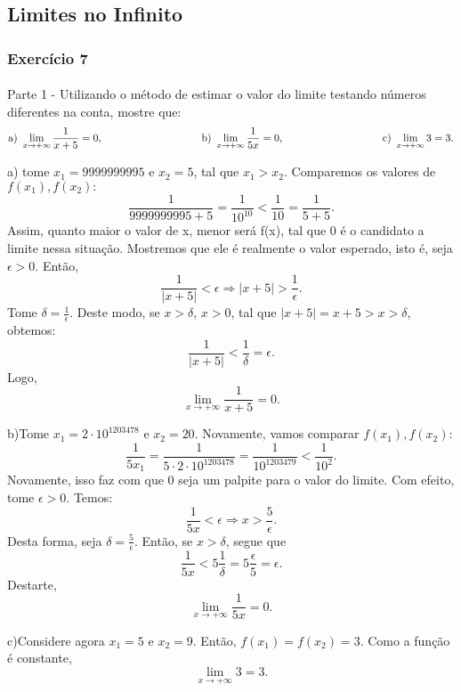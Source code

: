 \documentclass[exercícios_de_cálculo.tex]{subfiles}
\begin{document}
\subsection{Limites no Infinito}
\subsubsection{Exercício 7}
\paragraph{}Parte 1 - Utilizando o método de estimar o valor do limite testando números diferentes na conta, mostre que:
$$
	\text{a) }\lim_{x\to+\infty}\frac{1}{x + 5} = 0,\hspace{3.3cm}
	\text{b) }\lim_{x\to+\infty}\frac{1}{5x} = 0,\hspace{3.3cm}
	\text{c) }\lim_{x\to+\infty}3 = 3.
$$
\begin{sol*}
	a) tome $x_1 = 9999999995$ e $x_2 = 5$, tal que $x_1 > x_2$. Comparemos os valores de $f(x_1), f(x_2):$
	$$
		\frac{1}{9999999995 + 5} =\frac{1}{10^10} < \frac{1}{10} = \frac{1}{5 + 5}.
	$$
	Assim, quanto maior o valor de x, menor será f(x), tal que 0 é o candidato a limite nessa situação. Mostremos que ele é realmente o valor esperado, isto é, seja $\epsilon > 0$. Então,
	$$
		\frac{1}{|x + 5|} < \epsilon \Rightarrow |x + 5| > \frac{1}{\epsilon}.
	$$
	Tome $\delta = \frac{1}{\epsilon}.$ Deste modo, se $x > \delta$, $x > 0$, tal que $|x + 5| = x + 5 > x > \delta$, obtemos:
	$$
		\frac{1}{|x + 5|} < \frac{1}{\delta} = \epsilon.
	$$
	Logo,
	$$
		\lim_{x\to+\infty}\frac{1}{x + 5} = 0.
	$$

	b)Tome $x_1 = 2\cdot{10^{1203478}}$ e $x_2 = 20.$ Novamente, vamos comparar $f(x_1), f(x_2)$:
	$$
		\frac{1}{5x_1} = \frac{1}{5\cdot2\cdot{10^{1203478}}} = \frac{1}{10^{1203479}} < \frac{1}{10^2}.
	$$
	Novamente, isso faz com que 0 seja um palpite para o valor do limite. Com efeito, tome $\epsilon > 0$. Temos:
	$$
		\frac{1}{5x} < \epsilon \Rightarrow x > \frac{5}{\epsilon}.
	$$
	Desta forma, seja $\delta = \frac{5}{\epsilon}.$ Então, se $x > \delta$, segue que
	$$
		\frac{1}{5x} < 5\frac{1}{\delta} = 5\frac{\epsilon}{5} = \epsilon.
	$$
	Destarte,
	$$
		\lim_{x\to+\infty}\frac{1}{5x} = 0.
	$$

	c)Considere agora $x_1 = 5$ e $x_2 = 9$. Então, $f(x_1) = f(x_2) = 3.$ Como a função é constante,
	$$
		\lim_{x\to+\infty}3 = 3.
	$$
	\qedsymbol
\end{sol*}
\end{document}
